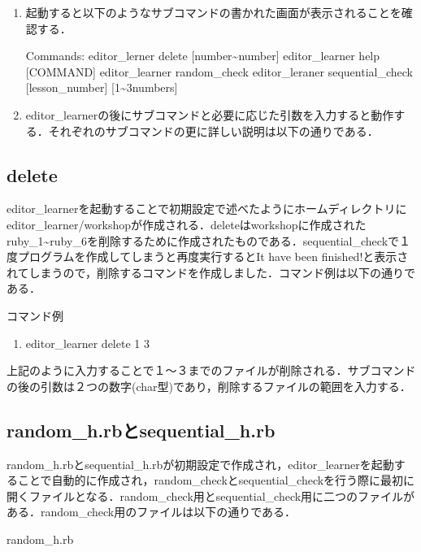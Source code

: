 \documentclass[11pt,dvipdfmx]{jsarticle}
\providecommand{\tightlist}{%
      \setlength{\itemsep}{0pt}\setlength{\parskip}{0pt}}
\begin{document}
\begin{enumerate}
\def\labelenumi{\arabic{enumi}.}
\item
  起動すると以下のようなサブコマンドの書かれた画面が表示されることを確認する．

  Commands: editor\_lerner delete {[}number\textasciitilde{}number{]}
  editor\_learner help {[}COMMAND{]} editor\_learner random\_check
  editor\_leraner sequential\_check {[}lesson\_number{]}
  {[}1\textasciitilde{}3numbers{]}
\item
  editor\_learnerの後にサブコマンドと必要に応じた引数を入力すると動作する．それぞれのサブコマンドの更に詳しい説明は以下の通りである．
\end{enumerate}

    \subsection{delete}\label{delete}

    editor\_learnerを起動することで初期設定で述べたようにホームディレクトリにeditor\_learner/workshopが作成される．deleteはworkshopに作成されたruby\_1\textasciitilde{}ruby\_6を削除するために作成されたものである．sequential\_checkで１度プログラムを作成してしまうと再度実行するとIt
have been
finished!と表示されてしまうので，削除するコマンドを作成しました．コマンド例は以下の通りである．

コマンド例

\begin{enumerate}
\def\labelenumi{\arabic{enumi}.}
\tightlist
\item
  editor\_learner delete 1 3
\end{enumerate}

上記のように入力することで１〜３までのファイルが削除される．サブコマンドの後の引数は２つの数字(char型)であり，削除するファイルの範囲を入力する．

    \subsection{random\_h.rbとsequential\_h.rb}\label{random_h.rbux3068sequential_h.rb}

random\_h.rbとsequential\_h.rbが初期設定で作成され，editor\_learnerを起動することで自動的に作成され，random\_checkとsequential\_checkを行う際に最初に開くファイルとなる．random\_check用とsequential\_check用に二つのファイルがある．random\_check用のファイルは以下の通りである．

random\_h.rb
\end{document}
